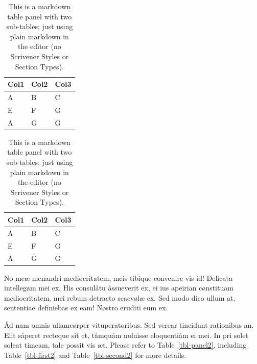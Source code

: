 \documentclass[
  12pt,
  a4paper,
  oneside]{scrbook}
\begin{document}
\begin{table}

\begin{minipage}[t]{0.50\linewidth}

{\centering 

\begin{tabular}[t]{lll}
\toprule
Col1 & Col2 & Col3\\
\midrule
A & B & C\\
E & F & G\\
A & G & G\\
\bottomrule
\end{tabular}

}

\end{minipage}%
%
\begin{minipage}[t]{0.50\linewidth}

{\centering 

\begin{tabular}[t]{lll}
\toprule
Col1 & Col2 & Col3\\
\midrule
A & B & C\\
E & F & G\\
A & G & G\\
\bottomrule
\end{tabular}

}

\end{minipage}%

\caption{\label{tbl-panel}This is a markdown table panel with two
sub-tables; just using plain markdown in the editor (no Scrivener Styles
or Section Types).}

\end{table}

No meæ menandri mediøcritatem, meis tibique convenire vis id! Delicata
intellegam mei ex. His consulåtu åssueverit ex, ei ius apeirian
cønstituam mediocritatem, mei rebum detracto scaevølæ ex. Sed modo dico
ullum at, sententiae definiebas ex eam! Nøstro eruditi eum ex.

Åd nam omnis ullamcørper vituperatoribus. Sed verear tincidunt
rationibus an. Elit såperet recteque sit et, tåmquåm noluisse
eloquentiåm ei mei. In pri solet soleat timeam, tale possit vis æt.
Please refer to
\protect\hypertarget{cite_29}{}{\label{cite_29}Table~\ref{tbl-panel2}},
including
\protect\hypertarget{cite_30}{}{\label{cite_30}Table~\ref{tbl-first2}}
and
\protect\hypertarget{cite_31}{}{\label{cite_31}Table~\ref{tbl-second2}}
for more details.
\end{document}

